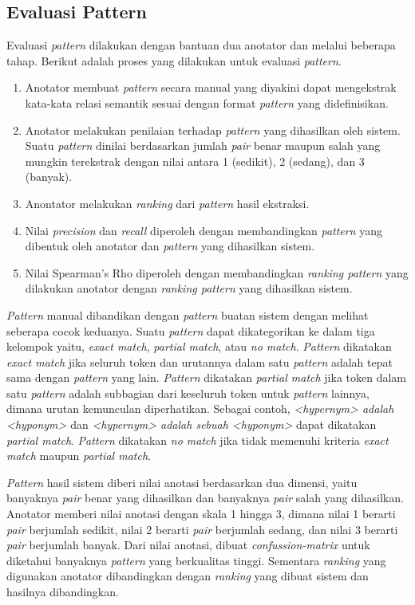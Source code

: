 \subsection{Evaluasi Pattern}
Evaluasi \textit{pattern} dilakukan dengan bantuan dua anotator dan melalui beberapa tahap. Berikut adalah proses yang dilakukan untuk evaluasi \textit{pattern}.
\begin{enumerate}
  \item Anotator membuat \textit{pattern} secara manual yang diyakini dapat mengekstrak kata-kata relasi semantik sesuai dengan format \textit{pattern} yang didefinisikan.
  \item Anotator melakukan penilaian terhadap \textit{pattern} yang dihasilkan oleh sistem. Suatu \textit{pattern} dinilai berdasarkan jumlah \textit{pair} benar maupun salah yang mungkin terekstrak dengan nilai antara 1 (sedikit), 2 (sedang), dan 3 (banyak).
  \item Anontator melakukan \textit{ranking} dari \textit{pattern} hasil ekstraksi.
  \item Nilai \textit{precision} dan \textit{recall} diperoleh dengan membandingkan \textit{pattern} yang dibentuk oleh anotator dan \textit{pattern} yang dihasilkan sistem.
  \item Nilai Spearman's Rho diperoleh dengan membandingkan \textit{ranking pattern} yang dilakukan anotator dengan \textit{ranking pattern} yang dihasilkan sistem.
\end{enumerate}

\textit{Pattern} manual dibandikan dengan \textit{pattern} buatan sistem dengan melihat seberapa cocok keduanya. Suatu \textit{pattern} dapat dikategorikan ke dalam tiga kelompok yaitu, \textit{exact match}, \textit{partial match}, atau \textit{no match}. \textit{Pattern} dikatakan \textit{exact match} jika seluruh token dan urutannya dalam satu \textit{pattern} adalah tepat sama dengan \textit{pattern} yang lain. \textit{Pattern} dikatakan \textit{partial match} jika token dalam satu \textit{pattern} adalah subbagian dari keseluruh token untuk \textit{pattern} lainnya, dimana urutan kemunculan diperhatikan. Sebagai contoh, \textit{<hypernym> adalah <hyponym>} dan \textit{<hypernym> adalah sebuah <hyponym>} dapat dikatakan \textit{partial match}. \textit{Pattern} dikatakan \textit{no match} jika tidak memenuhi kriteria \textit{exact match} maupun \textit{partial match}.

\textit{Pattern} hasil sistem diberi nilai anotasi berdasarkan dua dimensi, yaitu banyaknya \textit{pair} benar yang dihasilkan dan banyaknya \textit{pair} salah yang dihasilkan. Anotator memberi nilai anotasi dengan skala 1 hingga 3, dimana nilai 1 berarti \textit{pair} berjumlah sedikit, nilai 2 berarti \textit{pair} berjumlah sedang, dan nilai 3 berarti \textit{pair} berjumlah banyak. Dari nilai anotasi, dibuat \textit{confussion-matrix} untuk diketahui banyaknya \textit{pattern} yang berkualitas tinggi. Sementara \textit{ranking} yang digunakan anotator dibandingkan dengan \textit{ranking} yang dibuat sistem dan hasilnya dibandingkan.


